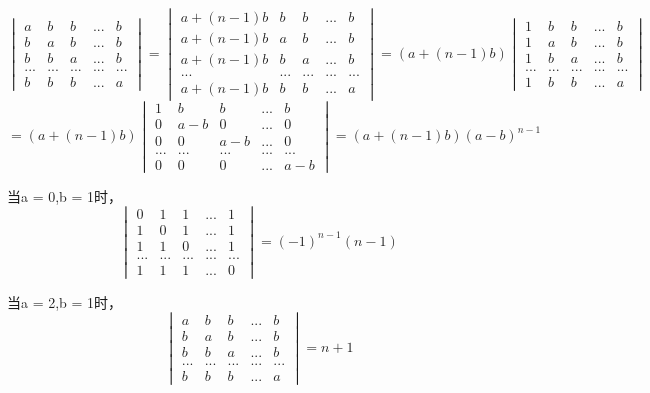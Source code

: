 \[
\begin{vmatrix}
a & b & b & ... & b \\
b & a & b & ... & b \\ 
b & b & a & ... & b \\ 
... & ... & ... & ... & ... \\ 
b & b & b & ... & a
\end{vmatrix} = 
\begin{vmatrix}
a + (n-1)b & b & b & ... & b \\
a + (n-1)b & a & b & ... & b \\ 
a + (n-1)b & b & a & ... & b \\ 
... & ... & ... & ... & ... \\ 
a + (n-1)b & b & b & ... & a
\end{vmatrix} = (a+(n-1)b)
\begin{vmatrix}
1 & b & b & ... & b \\
1 & a & b & ... & b \\ 
1 & b & a & ... & b \\ 
... & ... & ... & ... & ... \\ 
1 & b & b & ... & a
\end{vmatrix}
\]
\[= (a+(n-1)b)
\begin{vmatrix}
1 & b & b & ... & b \\
0 & a-b & 0 & ... & 0 \\ 
0 & 0 & a-b & ... & 0 \\ 
... & ... & ... & ... & ... \\ 
0 & 0 & 0 & ... & a-b
\end{vmatrix} = (a+(n-1)b)(a-b)^{n-1}
\]

当a = 0,b = 1时，
\[
\begin{vmatrix}
0 & 1 & 1 & ... & 1 \\
1 & 0 & 1 & ... & 1 \\ 
1 & 1 & 0 & ... & 1 \\ 
... & ... & ... & ... & ... \\ 
1 & 1 & 1 & ... & 0
\end{vmatrix} = (-1)^{n-1}(n - 1)
\]

当a = 2,b = 1时，
\[
\begin{vmatrix}
a & b & b & ... & b \\
b & a & b & ... & b \\ 
b & b & a & ... & b \\ 
... & ... & ... & ... & ... \\ 
b & b & b & ... & a
\end{vmatrix} = n + 1
\]

